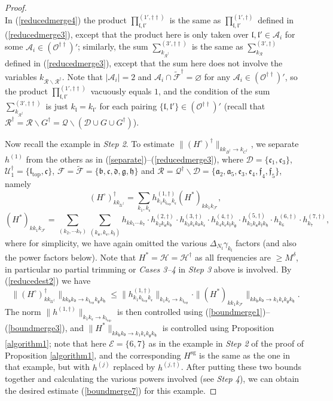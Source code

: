 \documentclass[11 pt,reqno]{amsart}
\theoremstyle{definition}
\theoremstyle{remark}
\numberwithin{equation}{section}
\newcommand{\Dc}{\mathcal{D}}
\newcommand{\Ec}{\mathcal{E}}
\newcommand{\Fc}{\mathcal{F}}
\newcommand{\Qc}{\mathcal{Q}}
\newcommand{\Rc}{\mathcal{R}}
\newcommand{\Uc}{\mathcal{U}}
\newcommand{\Ac}{\mathcal{A}}
\newcommand{\Hc}{\mathcal{H}}
\newcommand{\ff}{\mathfrak{f}}
\newcommand{\hf}{\mathfrak{h}}
\newcommand{\lf}{\mathfrak{l}}
\newcommand{\Os}{\mathscr{O}}
\newcommand{\af}{\mathfrak{a}}
\newcommand{\bff}{\mathfrak{b}}
\newcommand{\cf}{\mathfrak{c}}
\newcommand{\dff}{\mathfrak{d}}
\newcommand{\ef}{\mathfrak{e}}
\newcommand{\gf}{\mathfrak{g}}
\begin{document}
{\begin{proof}
\begin{equation}
\end{equation} In (\ref{reducedmerge4}) the product $\prod_{\lf,\lf'}^{(1',\dagger\dagger)}$ is the same as $\prod_{\lf,\lf'}^{(1',\dagger)}$ defined  in (\ref{reducedmerge3}), except that the product here is only taken over $\lf,\lf'\in\Ac_i$ for some $\Ac_i\in(\Os^{\dagger\dagger})'$; similarly, the sum $\sum_{k_{\Rc^\dagger}}^{(3',\dagger\dagger)}$ is the same as $\sum_{k_{\Rc}}^{(3',\dagger)}$ defined in (\ref{reducedmerge3}), except that the sum here does not involve the variables $k_{\Rc\backslash\Rc^\dagger}$. Note that $|\Ac_i|=2$ and $\Ac_i\cap \widetilde{\Fc}^\dagger=\varnothing$ for any $\Ac_i\in (\Os^{\dagger\dagger})'$, so the product $\prod_{\lf,\lf'}^{(1',\dagger\dagger)}$ vacuously equals $1$, and the condition of the sum $\sum_{k_{\Rc^\dagger}}^{(3',\dagger\dagger)}$ is just $k_\lf=k_{\lf'}$ for each pairing $\{\lf,\lf'\}\in(\Os^{\dagger\dagger})'$ (recall that $\Rc^\dagger = \Rc\backslash G^\dagger = \Qc\backslash (\Dc\cup G\cup G^\dagger)$).

Now recall the example in \emph{Step 2}. To estimate $\|(H^\circ)^\dagger\|_{kk_{B^\dagger}\to k_{C^\dagger}}$, we separate $h^{(1)}$ from the others as in (\ref{separate})--(\ref{reducedmerge3}), where  $\Dc = \{\cf_1, \cf_3\}$, $\Uc_1^\dagger=\{\lf_{\mathrm{top}}, \cf\}$, $\Fc =\widetilde{\Fc} =\{\bff, \cf, \dff, \gf, \hf\}$ and $\Rc = \Qc^{\dagger}\backslash \Dc=\{\af_2,\af_5,\ef_3,\ef_4,\ff_4,\ff_5\}$, namely
\[(H^\circ)_{kk_{\Uc^\dagger}}^\dagger=\sum_{k_1,k_\cf}h^{(1,\dagger)}_{k_1k_{\lf_{\mathrm{top}}}k_\cf}(H^*)_{kk_1k_\Fc},\]
\[(H^*)_{kk_1k_\Fc}=\sum_{(k_2,\cdots k_7)}\sum_{(k_\af,k_\ef,k_\ff)}h_{kk_1\cdots k_7}\cdot h_{k_2k_\af k_\bff}^{(2,\dagger)} \cdot h_{k_3k_\cf k_\dff k_\ef}^{(3,\dagger)}\cdot h_{k_4k_\ef k_\ff k_\gf}^{(4,\dagger)} \cdot h_{k_5k_\af k_\ff k_\hf}^{(5,\dagger)}\cdot h_{k_6}^{(6,\dagger)}\cdot h_{k_7}^{(7,\dagger)},\]
where for simplicity, we have again omitted the various $\Delta_{N_\lf}\gamma_{k_\lf}$ factors (and also the power factors below). Note that $H^* = \Hc = \Hc^{\dagger}$ as all frequencies are $\geq M^\delta$, in particular no partial trimming or \emph{Cases 3--4} in \emph{Step 3} above is involved. By (\ref{reducedest2}) we have
\[
\|(H^\circ)_{kk_{\Uc^\dagger}}^\dagger\|_{kk_\bff k_\dff\to k_{\lf_{\mathrm{top}}}k_\gf k_\hf}\leq\|h^{(1,\dagger)}_{k_1k_{\lf_{\mathrm{top}}}k_{\cf}}\|_{k_1k_\cf\to k_{\lf_{\mathrm{top}}}}\cdot
\|(H^*)_{kk_1k_\Fc}\|_{kk_\bff k_{\dff}\to k_1k_{\cf}k_{\gf}k_{\hf}}.
\] The norm $\|h^{(1,\dagger)}\|_{k_1k_\cf\to k_{\lf_{\mathrm{top}}}}$ is then controlled using (\ref{boundmerge1})--(\ref{boundmerge3}), and $\|H^*\|_{kk_\bff k_{\dff}\to k_1k_{\cf}k_{\gf}k_{\hf}}$ is controlled using Proposition \ref{algorithm1}; note that here $\Ec=\{6,7\}$ as in the example in \emph{Step 2} of the proof of Proposition \ref{algorithm1}, and the corresponding $H^{\mathrm{sg}}$ is the same as the one in that example, but with $h^{(j)}$ replaced by $h^{(j,\dagger)}$. After putting these two bounds together and calculating the various powers involved (see \emph{Step 4}), we can obtain the desired estimate (\ref{boundmerge7}) for this example.


\end{proof}}
\end{document}

